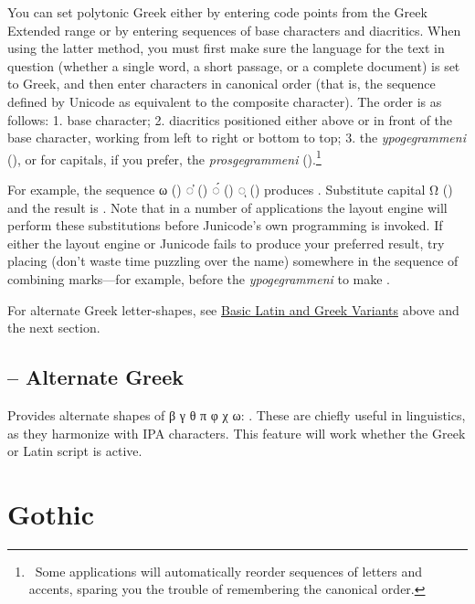 You can set polytonic Greek either by entering code points from the Greek
Extended range or by entering sequences of base characters and diacritics.
When using the latter method, you must first make sure the language for the
text in question (whether a single word, a short passage, or a complete
document) is set to Greek, and then enter characters in canonical order
(that is, the sequence defined by Unicode as equivalent to the composite
character). The order is as follows: 1. base character; 2. diacritics
positioned either above or in front of the base character, working from left
to right or bottom to top; 3. the \textit{ypogegrammeni} (), or for
capitals, if you prefer, the \textit{prosgegrammeni} ().\footnote{\ Some
applications will automatically reorder sequences of letters and accents,
sparing you the trouble of remembering the canonical order.}

For example, the sequence ω () ◌̓ () ◌́ () ◌ͅ ()
produces .
Substitute capital Ω () and the result is
. Note that in a number of applications the layout
engine will perform these substitutions before Junicode’s own programming is
invoked. If either the layout engine or Junicode fails to produce your
preferred result, try placing  
(don't waste time puzzling over the name) somewhere
in the sequence of combining marks—for example, before the \textit{ypogegrammeni}
to make .

For alternate Greek letter-shapes, see \hyperlink{LatGrkVariants}{Basic Latin and Greek Variants} above
and the next section.

\subsection{ – Alternate Greek}
Provides alternate shapes of {β γ θ π φ χ ω}:
.
These are chiefly useful in linguistics, as they harmonize with IPA characters. This feature
will work whether the Greek or Latin script is active.

\section{Gothic}
